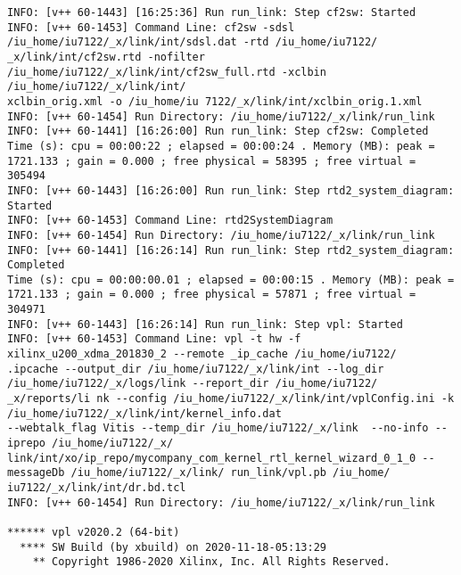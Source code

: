 \begin{lstlisting}[label=some-code-2,caption=Содержимое файла v++\_vinc.log]
INFO: [v++ 60-1443] [16:25:36] Run run_link: Step cf2sw: Started
INFO: [v++ 60-1453] Command Line: cf2sw -sdsl /iu_home/iu7122/_x/link/int/sdsl.dat -rtd /iu_home/iu7122/
_x/link/int/cf2sw.rtd -nofilter /iu_home/iu7122/_x/link/int/cf2sw_full.rtd -xclbin /iu_home/iu7122/_x/link/int/
xclbin_orig.xml -o /iu_home/iu 7122/_x/link/int/xclbin_orig.1.xml
INFO: [v++ 60-1454] Run Directory: /iu_home/iu7122/_x/link/run_link
INFO: [v++ 60-1441] [16:26:00] Run run_link: Step cf2sw: Completed
Time (s): cpu = 00:00:22 ; elapsed = 00:00:24 . Memory (MB): peak = 1721.133 ; gain = 0.000 ; free physical = 58395 ; free virtual = 305494
INFO: [v++ 60-1443] [16:26:00] Run run_link: Step rtd2_system_diagram: Started
INFO: [v++ 60-1453] Command Line: rtd2SystemDiagram
INFO: [v++ 60-1454] Run Directory: /iu_home/iu7122/_x/link/run_link
INFO: [v++ 60-1441] [16:26:14] Run run_link: Step rtd2_system_diagram: Completed
Time (s): cpu = 00:00:00.01 ; elapsed = 00:00:15 . Memory (MB): peak = 1721.133 ; gain = 0.000 ; free physical = 57871 ; free virtual = 304971
INFO: [v++ 60-1443] [16:26:14] Run run_link: Step vpl: Started
INFO: [v++ 60-1453] Command Line: vpl -t hw -f xilinx_u200_xdma_201830_2 --remote _ip_cache /iu_home/iu7122/
.ipcache --output_dir /iu_home/iu7122/_x/link/int --log_dir /iu_home/iu7122/_x/logs/link --report_dir /iu_home/iu7122/
_x/reports/li nk --config /iu_home/iu7122/_x/link/int/vplConfig.ini -k /iu_home/iu7122/_x/link/int/kernel_info.dat 
--webtalk_flag Vitis --temp_dir /iu_home/iu7122/_x/link  --no-info --iprepo /iu_home/iu7122/_x/
link/int/xo/ip_repo/mycompany_com_kernel_rtl_kernel_wizard_0_1_0 --messageDb /iu_home/iu7122/_x/link/ run_link/vpl.pb /iu_home/
iu7122/_x/link/int/dr.bd.tcl
INFO: [v++ 60-1454] Run Directory: /iu_home/iu7122/_x/link/run_link 

****** vpl v2020.2 (64-bit)
  **** SW Build (by xbuild) on 2020-11-18-05:13:29
    ** Copyright 1986-2020 Xilinx, Inc. All Rights Reserved.


\end{lstlisting}
